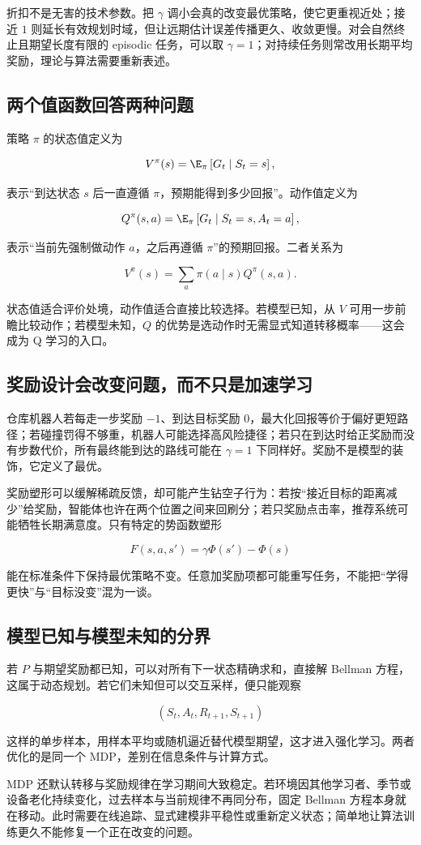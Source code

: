 折扣不是无害的技术参数。把 \(\gamma\) 调小会真的改变最优策略，使它更重视近处；接近 \(1\) 则延长有效规划时域，但让远期估计误差传播更久、收敛更慢。对会自然终止且期望长度有限的 episodic 任务，可以取 \(\gamma=1\)；对持续任务则常改用长期平均奖励，理论与算法需要重新表述。

\subsection{两个值函数回答两种问题}

策略 \(\pi\) 的状态值定义为

\[
V^\pi(s)
=
\E_\pi\left[G_t\mid S_t=s\right],
\]

表示``到达状态 \(s\) 后一直遵循 \(\pi\)，预期能得到多少回报''。动作值定义为

\[
Q^\pi(s,a)
=
\E_\pi\left[G_t\mid S_t=s,A_t=a\right],
\]

表示``当前先强制做动作 \(a\)，之后再遵循 \(\pi\)''的预期回报。二者关系为

\[
V^\pi(s)=\sum_a\pi(a\mid s)Q^\pi(s,a).
\]

状态值适合评价处境，动作值适合直接比较选择。若模型已知，从 \(V\) 可用一步前瞻比较动作；若模型未知，\(Q\) 的优势是选动作时无需显式知道转移概率——这会成为 Q 学习的入口。

\subsection{奖励设计会改变问题，而不只是加速学习}

仓库机器人若每走一步奖励 \(-1\)、到达目标奖励 \(0\)，最大化回报等价于偏好更短路径；若碰撞罚得不够重，机器人可能选择高风险捷径；若只在到达时给正奖励而没有步数代价，所有最终能到达的路线可能在 \(\gamma=1\) 下同样好。奖励不是模型的装饰，它定义了最优。

奖励塑形可以缓解稀疏反馈，却可能产生钻空子行为：若按``接近目标的距离减少''给奖励，智能体也许在两个位置之间来回刷分；若只奖励点击率，推荐系统可能牺牲长期满意度。只有特定的势函数塑形

\[
F(s,a,s')=\gamma\Phi(s')-\Phi(s)
\]

能在标准条件下保持最优策略不变。任意加奖励项都可能重写任务，不能把``学得更快''与``目标没变''混为一谈。

\subsection{模型已知与模型未知的分界}

若 \(P\) 与期望奖励都已知，可以对所有下一状态精确求和，直接解 Bellman 方程，这属于动态规划。若它们未知但可以交互采样，便只能观察

\[
(S_t,A_t,R_{t+1},S_{t+1})
\]

这样的单步样本，用样本平均或随机逼近替代模型期望，这才进入强化学习。两者优化的是同一个 MDP，差别在信息条件与计算方式。

MDP 还默认转移与奖励规律在学习期间大致稳定。若环境因其他学习者、季节或设备老化持续变化，过去样本与当前规律不再同分布，固定 Bellman 方程本身就在移动。此时需要在线追踪、显式建模非平稳性或重新定义状态；简单地让算法训练更久不能修复一个正在改变的问题。

